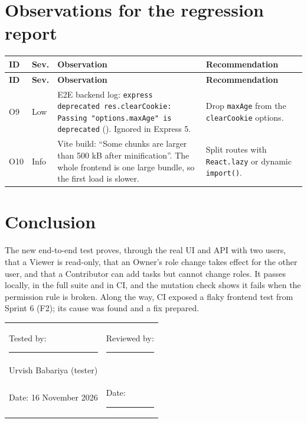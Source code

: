\documentclass[11pt,a4paper]{article}
\begin{document}
\section{Observations for the regression report}
{\small{}
\begin{xltabular}{\linewidth}{l l X X}\toprule
\textbf{ID} & \textbf{Sev.} & \textbf{Observation} & \textbf{Recommendation}\\\midrule\endfirsthead
\toprule\textbf{ID} & \textbf{Sev.} & \textbf{Observation} & \textbf{Recommendation}\\\midrule\endhead
O9 & Low & E2E backend log: \texttt{express deprecated res.clearCookie: Passing "options.maxAge" is deprecated} (). Ignored in Express 5. & Drop \texttt{maxAge} from the \texttt{clearCookie} options. \\
O10 & Info & Vite build: ``Some chunks are larger than 500 kB after minification''. The whole frontend is one large bundle, so the first load is slower. & Split routes with \texttt{React.lazy} or dynamic \texttt{import()}. \\
\bottomrule\end{xltabular}}

\section{Conclusion}
The new end-to-end test proves, through the real UI and API with two users, that a Viewer is read-only, that an Owner's role change takes
effect for the other user, and that a Contributor can add tasks but cannot change roles. It passes locally, in the full suite and in CI, and the
mutation check shows it fails when the permission rule is broken. Along the way, CI exposed a flaky frontend test from Sprint 6 (F2); its cause
was found and a fix prepared.

\vspace{1cm}\noindent
\begin{tabularx}{\linewidth}{X X}
Tested by: \rule{5cm}{0.4pt} & Reviewed by: \rule{5cm}{0.4pt}\\[2pt]
Urvish Babariya (tester) & \\[14pt]
Date: 16 November 2026 & Date: \rule{3.5cm}{0.4pt}\\
\end{tabularx}
\end{document}
